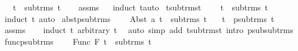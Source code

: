 \begin{isabellebody}
\ \ \ {\isachardoublequoteopen}t{}\ {\isasymin}\ sub{\isacharunderscore}{\kern0pt}trms\ t{}{\isachardoublequoteclose}\isanewline
%
\isadelimproof
\ \ %
\endisadelimproof
%
\isatagproof
{}\isamarkupfalse%
\ assms\isanewline
\ \ \isamarkupfalse%
{\isacharparenleft}{\kern0pt}induct\ t{}{\isacharparenright}{\kern0pt}{\isacharparenleft}{\kern0pt}auto{\isacharparenright}{\kern0pt}%
\endisatagproof
{\isafoldproof}%
%
\isadelimproof
\isanewline
%
\endisadelimproof
\isanewline
{}\isamarkupfalse%
\ t{\isacharunderscore}{\kern0pt}sub{\isacharunderscore}{\kern0pt}trms{\isacharunderscore}{\kern0pt}t{\isacharcolon}{\kern0pt}\ \isanewline
\ \ \ {\isachardoublequoteopen}t\ {\isasymin}\ sub{\isacharunderscore}{\kern0pt}trms\ t{\isachardoublequoteclose}\isanewline
%
\isadelimproof
\ \ %
\endisadelimproof
%
\isatagproof
{}\isamarkupfalse%
\ {\isacharparenleft}{\kern0pt}induct\ t{\isacharparenright}{\kern0pt}\ {\isacharparenleft}{\kern0pt}auto{\isacharparenright}{\kern0pt}%
\endisatagproof
{\isafoldproof}%
%
\isadelimproof
\isanewline
%
\endisadelimproof
\isanewline
{}\isamarkupfalse%
\ abst{\isacharunderscore}{\kern0pt}psub{\isacharunderscore}{\kern0pt}trms{\isacharcolon}{\kern0pt}\ \isanewline
\ \ \ {\isachardoublequoteopen}Abst\ a\ t{}\ {\isasymin}\ sub{\isacharunderscore}{\kern0pt}trms\ t{}{\isachardoublequoteclose}\isanewline
\ \ \ {\isachardoublequoteopen}t{}\ {\isasymin}\ psub{\isacharunderscore}{\kern0pt}trms\ t{}{\isachardoublequoteclose}\isanewline
%
\isadelimproof
\ \ %
\endisadelimproof
%
\isatagproof
{}\isamarkupfalse%
\ assms\isanewline
\ \ \isamarkupfalse%
\ {\isacharparenleft}{\kern0pt}induct\ t{}\ arbitrary{\isacharcolon}{\kern0pt}\ t{}{\isacharparenright}{\kern0pt}\isanewline
\ \ {\isacharparenleft}{\kern0pt}auto\ simp\ add{\isacharcolon}{\kern0pt}\ t{\isacharunderscore}{\kern0pt}sub{\isacharunderscore}{\kern0pt}trms{\isacharunderscore}{\kern0pt}t\ intro{\isacharcolon}{\kern0pt}\ psub{\isacharunderscore}{\kern0pt}sub{\isacharunderscore}{\kern0pt}trms{\isacharparenright}{\kern0pt}%
\endisatagproof
{\isafoldproof}%
%
\isadelimproof
\isanewline
%
\endisadelimproof
\isanewline
{}\isamarkupfalse%
\ func{\isacharunderscore}{\kern0pt}psub{\isacharunderscore}{\kern0pt}trms{\isacharcolon}{\kern0pt}\ \isanewline
\ \ \ {\isachardoublequoteopen}Func\ F\ t{}\ {\isasymin}\ sub{\isacharunderscore}{\kern0pt}trms\ t{}{\isachardoublequoteclose}\isanewline

\end{isabellebody}
